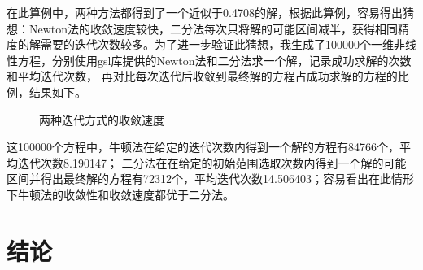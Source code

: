 \documentclass{article}
\begin{document}
     在此算例中，两种方法都得到了一个近似于0.4708的解，根据此算例，容易得出猜想：Newton法的收敛速度较快，二分法每次只将解的可能区间减半，获得相同精度的解需要的迭代次数较多。为了进一步验证此猜想，我生成了100000个一维非线性方程，分别使用gsl库提供的Newton法和二分法求一个解\cite{GSL_roots}，记录成功求解的次数和平均迭代次数，
     再对比每次迭代后收敛到最终解的方程占成功求解的方程的比例，结果如下。

     \begin{figure}[H]
          \begin{center}
               
          \end{center}
          \caption{两种迭代方式的收敛速度}
     \end{figure}
     
     这100000个方程中，牛顿法在给定的迭代次数内得到一个解的方程有84766个，平均迭代次数8.190147；
     二分法在在给定的初始范围选取次数内得到一个解的可能区间并得出最终解的方程有72312个，平均迭代次数14.506403；容易看出在此情形下牛顿法的收敛性和收敛速度都优于二分法。

\section{结论}

     

\end{document}
